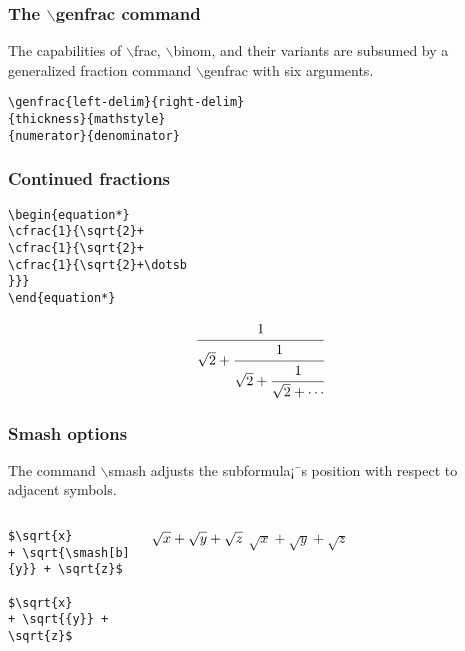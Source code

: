 \documentclass[12pt]{beamer}
\begin{document}
\begin{frame}[fragile]
\frametitle{The $\backslash$genfrac command}
The capabilities of $\backslash$frac, $\backslash$binom, and their variants are subsumed by a generalized
fraction command $\backslash$genfrac with six arguments.
\begin{verbatim}
\genfrac{left-delim}{right-delim}
{thickness}{mathstyle}
{numerator}{denominator}
\end{verbatim}
\end{frame}

\begin{frame}[fragile]
\frametitle{Continued fractions}
\begin{verbatim}
\begin{equation*}
\cfrac{1}{\sqrt{2}+
\cfrac{1}{\sqrt{2}+
\cfrac{1}{\sqrt{2}+\dotsb
}}}
\end{equation*}
\end{verbatim}
\begin{equation*}
\cfrac{1}{\sqrt{2}+
\cfrac{1}{\sqrt{2}+
\cfrac{1}{\sqrt{2}+\dotsb
}}}
\end{equation*}
\end{frame}

\begin{frame}[fragile]
\frametitle{Smash options}
The command $\backslash$smash adjusts the subformula¡¯s
position with respect to adjacent symbols.
    \begin{columns}
        \begin{block}{}
        \begin{verbatim}
$\sqrt{x}
+ \sqrt{\smash[b]
{y}} + \sqrt{z}$

$\sqrt{x}
+ \sqrt{{y}} +
\sqrt{z}$
        \end{verbatim}
        \end{block}
        \begin{block}{}
        $\sqrt{x}
        + \sqrt{\smash[b]{y}} + \sqrt{z}$
        $\sqrt{x}
        + \sqrt{{y}} + \sqrt{z}$
        \end{block}
    \end{columns}
\end{frame}
\end{document}
